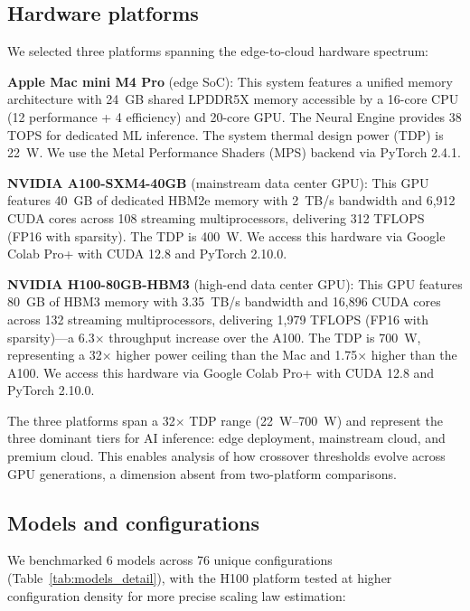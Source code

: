\documentclass[preprint,12pt]{elsarticle}
\begin{document}
\subsection{Hardware platforms}

We selected three platforms spanning the edge-to-cloud hardware spectrum:

\textbf{Apple Mac mini M4 Pro} (edge SoC): This system features a unified memory architecture with 24~GB shared LPDDR5X memory accessible by a 16-core CPU (12 performance + 4 efficiency) and 20-core GPU. The Neural Engine provides 38 TOPS for dedicated ML inference. The system thermal design power (TDP) is 22~W. We use the Metal Performance Shaders (MPS) backend via PyTorch 2.4.1.

\textbf{NVIDIA A100-SXM4-40GB} (mainstream data center GPU): This GPU features 40~GB of dedicated HBM2e memory with 2~TB/s bandwidth and 6,912 CUDA cores across 108 streaming multiprocessors, delivering 312 TFLOPS (FP16 with sparsity). The TDP is 400~W. We access this hardware via Google Colab Pro+ with CUDA 12.8 and PyTorch 2.10.0.

\textbf{NVIDIA H100-80GB-HBM3} (high-end data center GPU): This GPU features 80~GB of HBM3 memory with 3.35~TB/s bandwidth and 16,896 CUDA cores across 132 streaming multiprocessors, delivering 1,979 TFLOPS (FP16 with sparsity)---a 6.3$\times$ throughput increase over the A100. The TDP is 700~W, representing a 32$\times$ higher power ceiling than the Mac and 1.75$\times$ higher than the A100. We access this hardware via Google Colab Pro+ with CUDA 12.8 and PyTorch 2.10.0.

The three platforms span a 32$\times$ TDP range (22~W--700~W) and represent the three dominant tiers for AI inference: edge deployment, mainstream cloud, and premium cloud. This enables analysis of how crossover thresholds evolve across GPU generations, a dimension absent from two-platform comparisons.

\subsection{Models and configurations}

We benchmarked 6 models across 76 unique configurations (Table~\ref{tab:models_detail}), with the H100 platform tested at higher configuration density for more precise scaling law estimation:
\end{document}
